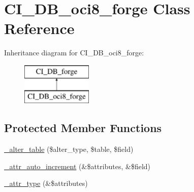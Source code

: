 \hypertarget{class_c_i___d_b__oci8__forge}{}\section{C\+I\+\_\+\+D\+B\+\_\+oci8\+\_\+forge Class Reference}
\label{class_c_i___d_b__oci8__forge}
Inheritance diagram for C\+I\+\_\+\+D\+B\+\_\+oci8\+\_\+forge\+:\begin{figure}[H]
\begin{center}
\leavevmode
\includegraphics[height=2.000000cm]{class_c_i___d_b__oci8__forge}
\end{center}
\end{figure}
\subsection*{Protected Member Functions}
\begin{DoxyCompactItemize}
\item 
\mbox{\hyperlink{class_c_i___d_b__oci8__forge_ad539733a69b99fc60bc16eeb4008470b}{\+\_\+alter\+\_\+table}} (\$alter\+\_\+type, \$table, \$field)
\item 
\mbox{\hyperlink{class_c_i___d_b__oci8__forge_a6407bddc174b473bb72b47f94dd4852c}{\+\_\+attr\+\_\+auto\+\_\+increment}} (\&\$attributes, \&\$field)
\item 
\mbox{\hyperlink{class_c_i___d_b__oci8__forge_a170eee8aadf7b0b8fb1ed89c0cf53537}{\+\_\+attr\+\_\+type}} (\&\$attributes)
\end{DoxyCompactItemize}
